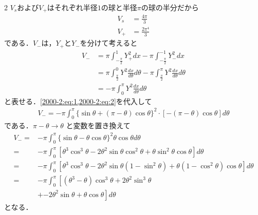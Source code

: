 \documentclass[../../main.tex]{subfiles}
\begin{document}
\begin{multicols}{2}
  $V_{s}$および$V_{+}$はそれぞれ半径$1$の球と半径$\pi$の球の半分だから
  \begin{align}
    V_{s} & = \frac{4\pi}{3} \label{2000-2:eq:8}   \\
    V_{+} & = \frac{2\pi^4}{3} \label{2000-2:eq:9}
  \end{align}
  である．$V_{-}$は，$Y_{+}$と$Y_{-}$を分けて考えると
  \begin{align}
    V_{-}
     & = \pi \int_{-\frac{\pi}{2}}^{1} Y_{+}^2 dx - \pi \int_{-\frac{\pi}{2}}^{-1} Y_{-}^2 dx                                      \nonumber   \\
     & = \pi \int_{\frac{\pi}{2}}^{0} Y^2 \frac{dx}{d\theta} d\theta - \pi \int_{\frac{\pi}{2}}^{\pi} Y^2 \frac{dx}{d\theta} d\theta \nonumber \\
     & = -\pi \int_{0}^{\pi} Y^2 \frac{dx}{d\theta} d\theta \label{2000-2:eq:10}
  \end{align}
  と表せる．\cref{2000-2:eq:1,2000-2:eq:2}を代入して
  \begin{align*}
    V_{-} =  -\pi \int_{0}^{\pi} \{ \sin\theta + (\pi - \theta) \cos\theta \}^2 \cdot \left[-(\pi - \theta)\cos\theta\right] d\theta
  \end{align*}
  である．$\pi - \theta \to \theta$ と変数を置き換えて
  \begin{align*}
    V_{-}
    = & -\pi \int_{0}^{\pi} \{ \sin\theta - \theta\cos\theta \}^2 \theta \cos\theta  d\theta                                                      \\
    = & -\pi \int_{0}^{\pi} \left[\theta^3\cos^3\theta -2 \theta^2\sin\theta\cos^2\theta + \theta \sin^2\theta\cos\theta \right]  d\theta         \\
    = & -\pi \int_{0}^{\pi} \left[\theta^3\cos^3\theta -2 \theta^2\sin\theta(1-\sin^2\theta) + \theta (1-\cos^2\theta)\cos\theta \right]  d\theta \\
    = & -\pi \int_{0}^{\pi} \left[\left(\theta^3-\theta\right)\cos^3\theta + 2\theta^2\sin^3\theta \right.                                        \\
      & + \left.-2 \theta^2\sin\theta + \theta \cos\theta \right]  d\theta
  \end{align*}
  となる．


\end{multicols}
\end{document}
